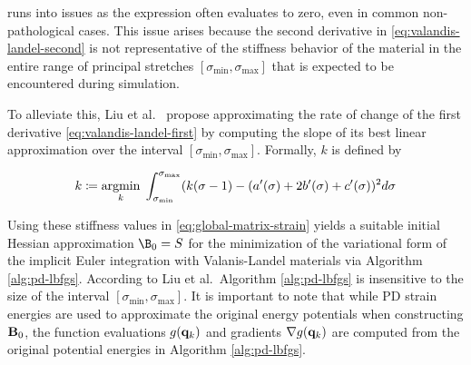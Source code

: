 \noindent runs into issues as the expression often evaluates to zero, even in common non-pathological cases. This issue arises because
the second derivative in \autoref{eq:valandis-landel-second} is not representative of the stiffness behavior of the material in the 
entire range of principal stretches $[\sigma_{\text{min}}, \sigma_{\text{max}}]$ that is expected to be encountered during simulation.

To alleviate this, Liu et al.\ \cite{liu2017} propose approximating the rate of change of the first derivative \autoref{eq:valandis-landel-first}
by computing the slope of its best linear approximation over the interval $[\sigma_{\text{min}}, \sigma_{\text{max}}]$. Formally, $k$ is 
defined by

\begin{equation}\label{eq:valanis-landel-k}
    k \coloneqq \underset{k}{\operatorname{argmin}}\; \int^{\sigma_{\text{max}}}_{\sigma_{\text{min}}} (k(\sigma - 1) - (a^{\prime}(\sigma) + 2b^{\prime}(\sigma) + 
    c^{\prime}(\sigma))^2 d\sigma
\end{equation}

\noindent Using these stiffness values in \autoref{eq:global-matrix-strain} yields a suitable initial Hessian approximation $\B_0 = S$ for
the minimization of the variational form of the implicit Euler integration with Valanis-Landel materials via Algorithm \ref{alg:pd-lbfgs}. According
to Liu et al.\ Algorithm \ref{alg:pd-lbfgs} is insensitive to the size of the interval $[\sigma_{\text{min}}, \sigma_{\text{max}}]$. It is important
to note that while PD strain energies are used to approximate the original energy potentials when constructing $\mathbf{B}_0$, the function
evaluations $g(\mathbf{q}_k)$ and gradients $\nabla g(\mathbf{q}_k)$ are computed from the original potential energies in Algorithm \ref{alg:pd-lbfgs}.


